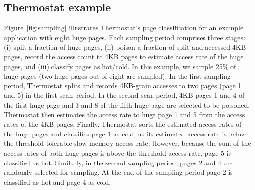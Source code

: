 \subsection{Thermostat example}
Figure~\ref{fig:sampling} illustrates Thermostat's page classification for an
example application with eight huge pages. Each sampling period comprises 
three stages: (i) split a fraction of huge pages, (ii) poison a fraction of split and
accessed 4KB pages, record the access count to 4KB pages to estimate access rate
of the huge pages, and (iii) classify pages as hot/cold. In this example, we sample 25\% of
huge pages (two huge pages out of eight are sampled). In the first sampling
period, Thermostat splits and records 4KB-grain accesses to two pages (page 1
and 5) in the first scan period. In the second scan period, 4KB pages 1 and 4
of the first huge page and 3 and 8 of the fifth huge page are selected to be poisoned.
Thermostat then estimates the access rate to huge page 1 and 5 from the access rates
of the 4KB pages.  Finally, Thermostat sorts the estimated access rates of the huge pages
and classifies page 1 as cold, as its estimated access rate is below
the threshold tolerable slow memory access rate. However, because the sum of the
access rates of both huge pages is above the threshold access rate, page 5 is classified
as hot. Similarly, in the second sampling period, pages 2 and 4 are randomly
selected for sampling. At the end of the sampling period page 2 is classified as
hot and page 4 as cold.

